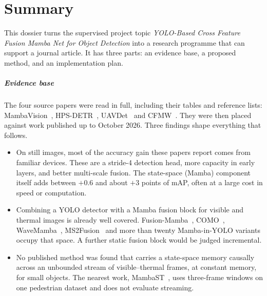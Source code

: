 \chapter*{Summary}

This dossier turns the supervised project topic \emph{YOLO-Based Cross Feature
Fusion Mamba Net for Object Detection} into a research programme that can
support a journal article. It has three parts: an evidence base, a proposed
method, and an implementation plan.

\paragraph{Evidence base}
The four source papers were read in full, including their tables and
reference lists: MambaVision~\citep{hatamizadeh2025mambavision},
HPS-DETR~\citep{wang2025hpsdetr}, UAVDet~\citep{yang2026uavdet} and
CFMW~\citep{li2025cfmw}. They were then placed against work published up to
October 2026. Three findings shape everything that follows.
\begin{itemize}
  \item On still images, most of the accuracy gain these papers report comes
        from familiar devices. These are a stride-4 detection head, more
        capacity in early layers, and better multi-scale fusion. The state-space
        (Mamba) component itself adds between $+0.6$ and about $+3$ points of
        mAP, often at a large cost in speed or computation.
  \item Combining a YOLO detector with a Mamba fusion block for visible and
        thermal images is already well covered. Fusion-Mamba~\citep{dong2025fusionmamba},
        COMO~\citep{como2024}, WaveMamba~\citep{wavemamba2025},
        MS2Fusion~\citep{ms2fusion2025} and more than twenty
        Mamba-in-YOLO variants occupy that space. A further static fusion
        block would be judged incremental.
  \item No published method was found that carries a state-space memory
        causally across an unbounded stream of visible--thermal frames, at
        constant memory, for small objects. The nearest work,
        MambaST~\citep{mambast2024}, uses three-frame windows on one pedestrian
        dataset and does not evaluate streaming.
\end{itemize}

